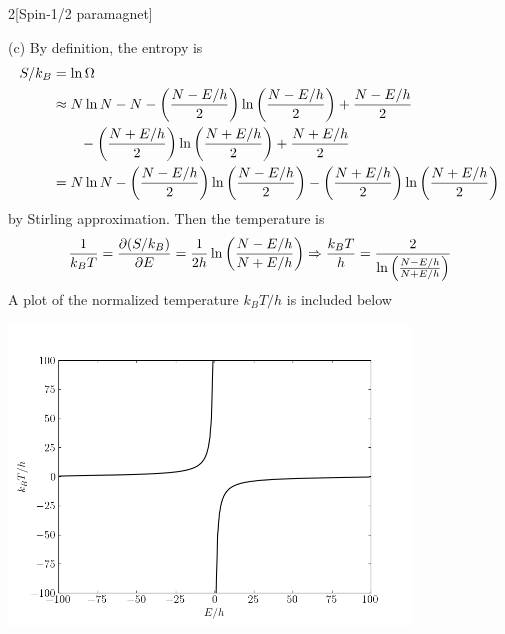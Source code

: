\documentclass[12pt]{article}
\begin{document}
\begin{problem}{2}[Spin-1/2 paramagnet]
\begin{solution}
(c) By definition, the entropy is
\begin{align}
    S/k_B&=\ln\Omega\notag\\
    &\approx N\ln N-N-\qty(\frac{N-E/h}{2})\ln\qty(\frac{N-E/h}{2})
    +\frac{N-E/h}{2}\notag\\
    &\qquad-\qty(\frac{N+E/h}{2})\ln\qty(\frac{N+E/h}{2})
    +\frac{N+E/h}{2}\notag\\
    &=N\ln N-\qty(\frac{N-E/h}{2})\ln\qty(\frac{N-E/h}{2})
    -\qty(\frac{N+E/h}{2})\ln\qty(\frac{N+E/h}{2})
\end{align}
by Stirling approximation. Then the temperature is
\begin{align}\label{p1c:T}
    \frac1{k_BT}=\frac{\partial(S/k_B)}{\partial E}
    =\frac1{2h}\ln\qty(\frac{N-E/h}{N+E/h})
    \Rightarrow\frac{k_BT}{h}=\frac{2}{\ln\qty(\frac{N-E/h}{N+E/h})}
\end{align}
A plot of the normalized temperature $k_BT/h$ is included below
\begin{center}
    \includegraphics[width=0.8\textwidth]{p1c.png} 
\end{center}


\end{solution}
\end{problem}
\end{document}
